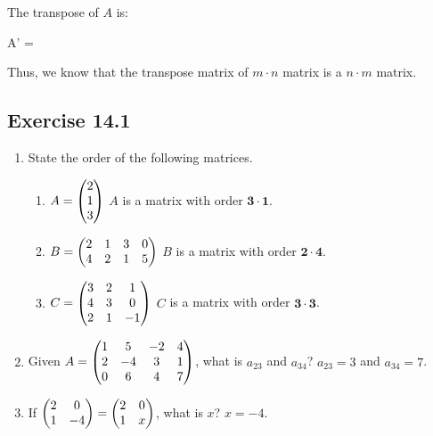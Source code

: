\documentclass{report}
\begin{document}
\begin{multicols}{2}
  The transpose of $A$ is:
  \begin{cequation}
    A' = 
  \end{cequation}

  Thus, we know that the transpose matrix of $m \cdot n$ matrix is a $n \cdot m$
  matrix.

  \singlespacing{}

  \subsection{Exercise 14.1}

  \begin{enumerate}
    \item State the order of the following matrices.

          \begin{enumerate}

            \item $A = \begin{pmatrix}
                      2 \\
                      1 \\
                      3
                    \end{pmatrix}$
                  \sol{}
                  $A$ is a matrix with order $\mathbf{3 \cdot 1}$.

            \item $B = \begin{pmatrix}
                      2 & 1 & 3 & 0 \\
                      4 & 2 & 1 & 5
                    \end{pmatrix}$
                  \sol{}
                  $B$ is a matrix with order $\mathbf{2 \cdot 4}$.

            \item $C = \begin{pmatrix}
                      3 & 2 & 1  \\
                      4 & 3 & 0  \\
                      2 & 1 & -1
                    \end{pmatrix}$
                  \sol{}
                  $C$ is a matrix with order $\mathbf{3 \cdot 3}$.

          \end{enumerate}

    \item Given $A = \begin{pmatrix} 1 & 5 & -2 & 4 \\ 2 & -4 & 3 & 1 \\ 0 & 6 & 4 & 7 \end{pmatrix}$, what is
          $a_{23}$ and $a_{34}$? \sol{} $a_{23} = 3$ and $a_{34} = 7$.

    \item If $\begin{pmatrix} 2 & 0 \\ 1 & -4 \end{pmatrix} = \begin{pmatrix} 2 & 0 \\ 1 & x \end{pmatrix}$, what is $x$? \sol{} $x =
            -4$.
  \end{enumerate}


\end{multicols}
\end{document}
